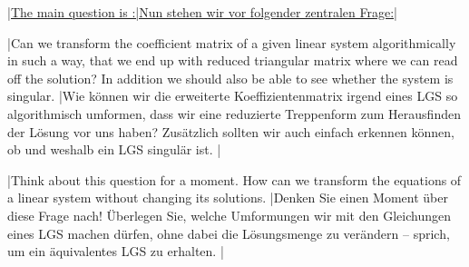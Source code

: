 \vsp

\underline{\tr|The main question is :|Nun stehen wir vor folgender zentralen Frage:|}

\tr|Can we transform the coefficient matrix of a given linear system algorithmically in such a way, that we end up with  reduced triangular matrix where we can read off the solution?
    In addition we should also be able to see whether the system is singular.
   |Wie können wir die erweiterte Koeffizientenmatrix irgend eines LGS so algorithmisch umformen, dass wir eine reduzierte Treppenform zum Herausfinden der Lösung vor uns haben?
   Zusätzlich sollten wir auch einfach erkennen können, ob und weshalb ein LGS singulär ist. |

\begin{exer}
\tr|Think about this question for a moment. How can we transform the equations of a linear system without changing its solutions. 
   |Denken Sie einen Moment über diese Frage nach! Überlegen Sie, welche Umformungen wir mit den Gleichungen eines LGS machen dürfen,
    ohne dabei die Lösungsmenge zu verändern -- sprich, um ein äquivalentes LGS zu erhalten. |
\end{exer}

\newpage

